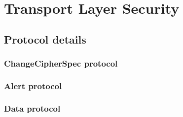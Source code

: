 \chapter{Transport Layer Security}











\section{Protocol details}



\subsection{ChangeCipherSpec protocol}
\subsection{Alert protocol}
\subsection{Data protocol}


